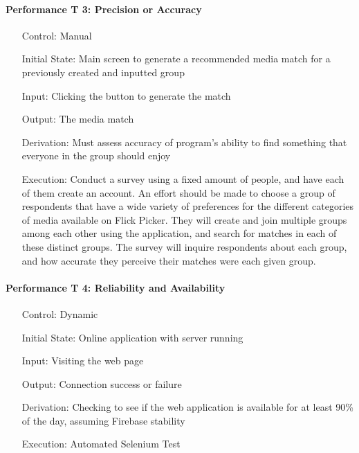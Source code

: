 \documentclass[12pt, titlepage]{article}
\begin{document}
\paragraph*{Performance T 3: Precision or Accuracy}
\begin{itemize}
	\item[Control:] Manual
	\item[Initial State:] Main screen to generate a recommended media match for a previously created and inputted group
	\item[Input:] Clicking the button to generate the match
	\item[Output:] The media match
	\item[Derivation:] Must assess accuracy of program's ability to find something that everyone in the group should enjoy
	\item[Execution:] Conduct a survey using a fixed amount of people, and have each of them create an account. An effort should be made to choose a group of respondents that have a wide variety of preferences for the different categories of media available on Flick Picker. They will create and join multiple groups among each other using the application, and search for matches in each of these distinct groups. The survey will inquire respondents about each group, and how accurate they perceive their matches were each given group.
\end{itemize}

\paragraph*{Performance T 4: Reliability and Availability}
\begin{itemize}
	\item[Control:] Dynamic
	\item[Initial State:] Online application with server running
	\item[Input:] Visiting the web page
	\item[Output:] Connection success or failure
	\item[Derivation:] Checking to see if the web application is available for at least 90\% of the day, assuming Firebase stability
	\item[Execution:] Automated Selenium Test
\end{itemize}
\end{document}
